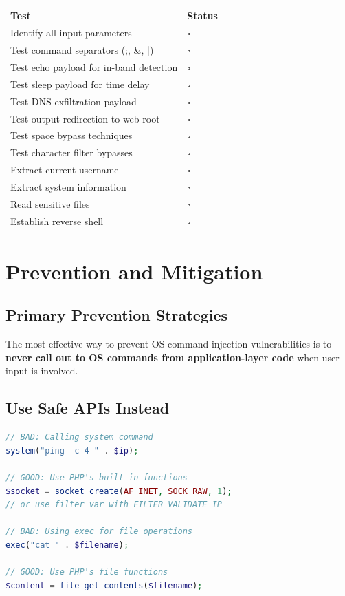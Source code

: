 \documentclass[12pt]{article}
\begin{document}
\begin{longtable}{|p{10cm}|p{3cm}|}
\hline
\textbf{Test} & \textbf{Status} \\
\hline
Identify all input parameters & $\square$ \\
\hline
Test command separators (;, \&, |) & $\square$ \\
\hline
Test echo payload for in-band detection & $\square$ \\
\hline
Test sleep payload for time delay & $\square$ \\
\hline
Test DNS exfiltration payload & $\square$ \\
\hline
Test output redirection to web root & $\square$ \\
\hline
Test space bypass techniques & $\square$ \\
\hline
Test character filter bypasses & $\square$ \\
\hline
Extract current username & $\square$ \\
\hline
Extract system information & $\square$ \\
\hline
Read sensitive files & $\square$ \\
\hline
Establish reverse shell & $\square$ \\
\hline
\end{longtable}

\section{Prevention and Mitigation}

\subsection{Primary Prevention Strategies}

\begin{criticalbox}
The most effective way to prevent OS command injection vulnerabilities is to \textbf{never call out to OS commands from application-layer code} when user input is involved.
\end{criticalbox}

\subsection{Use Safe APIs Instead}

\begin{lstlisting}[language=PHP]
// BAD: Calling system command
system("ping -c 4 " . $ip);

// GOOD: Use PHP's built-in functions
$socket = socket_create(AF_INET, SOCK_RAW, 1);
// or use filter_var with FILTER_VALIDATE_IP

// BAD: Using exec for file operations
exec("cat " . $filename);

// GOOD: Use PHP's file functions
$content = file_get_contents($filename);
\end{lstlisting}
\end{document}
